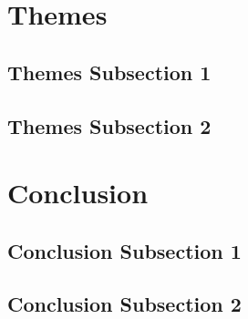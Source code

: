 \documentclass[12pt, letterpaper]{article}
\begin{document}
\section{Themes}
\lipsum[7-8]

\subsection{Themes Subsection 1}
\lipsum[23-24]

\subsection{Themes Subsection 2}
\lipsum[25-26]

\section{Conclusion}
\lipsum[9-10]

\subsection{Conclusion Subsection 1}
\lipsum[27-28]

\subsection{Conclusion Subsection 2}
\lipsum[29-30]
\end{document}
